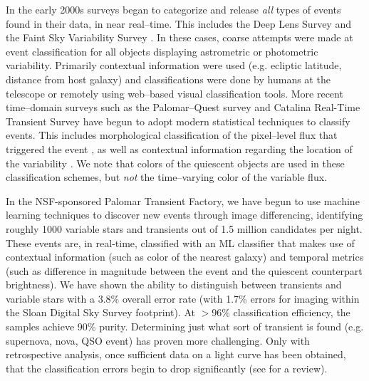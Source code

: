 
In the early 2000s surveys began to categorize and release {\it all} types of
events found in their data, in near real--time. This includes the Deep Lens
Survey \citep{Becker04a} and the Faint Sky Variability Survey
\citep{2003MNRAS.339..427G}.  In these cases, coarse attempts were made at event
classification for all objects displaying astrometric or photometric
variability. Primarily contextual information were used (e.g. ecliptic latitude,
distance from host galaxy) and classifications were done by humans at the
telescope or remotely using web--based visual classification tools.  More recent
time--domain surveys such as the Palomar--Quest survey
\citep{2008AN....329..263D} and Catalina Real-Time Transient Survey
\citep{2011arXiv1102.5004D} have begun to adopt modern statistical techniques to
classify events.  This includes morphological classification of the pixel--level
flux that triggered the event \citep{2008AIPC.1082..252D}, as well as contextual
information regarding the location of the variability
\citep{2010ASPC..434..115M}.  We note that colors of the quiescent objects are
used in these classification schemes, but {\it not} the time--varying color of
the variable flux.


In the NSF-sponsored Palomar Transient Factory, we have begun to use machine
learning techniques to discover new events through image differencing,
identifying roughly 1000 variable stars and transients out of 1.5 million
candidates per night. These events are, in real-time, classified with an ML
classifier that makes use of contextual information (such as color of the
nearest galaxy) and temporal metrics (such as difference in magnitude between
the event and the quiescent counterpart brightness). We have shown
\citep{2011arXiv1106.5491B} the ability to  distinguish between transients and
variable stars with a 3.8\% overall error rate (with 1.7\% errors for imaging
within the Sloan Digital Sky Survey footprint). At $>$96\% classification
efficiency, the samples achieve 90\% purity. Determining just what sort of
transient is found (e.g. supernova, nova, QSO event) has proven more
challenging. Only with retrospective analysis, once sufficient data on a light
curve has been obtained, that the classification errors begin to drop
significantly \citep{2011ApJ...733...10R} (see \citealt{2011arXiv1104.3142B} for
a review).

